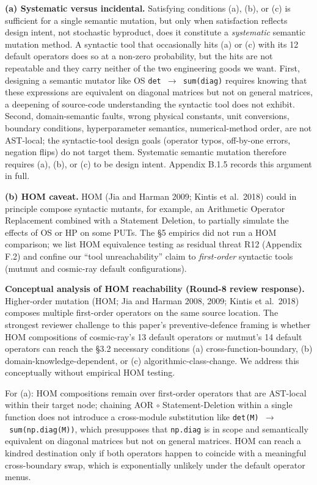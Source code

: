 \documentclass[review,12pt,authoryear]{elsarticle}
\begin{document}
\textbf{(a) Systematic versus incidental.} Satisfying conditions (a),
(b), or (c) is sufficient for a single semantic mutation, but only when
satisfaction reflects design intent, not stochastic byproduct, does it
constitute a \emph{systematic} semantic mutation method. A syntactic
tool that occasionally hits (a) or (c) with its 12 default operators
does so at a non-zero probability, but the hits are not repeatable and
they carry neither of the two engineering goods we want. First,
designing a semantic mutator like OS \texttt{det\ $\to$\ sum(diag)} requires
knowing that these expressions are equivalent on diagonal matrices but
not on general matrices, a deepening of source-code understanding the
syntactic tool does not exhibit. Second, domain-semantic faults, wrong
physical constants, unit conversions, boundary conditions,
hyperparameter semantics, numerical-method order, are not AST-local; the
syntactic-tool design goals (operator typos, off-by-one errors, negation
flips) do not target them. Systematic semantic mutation therefore
requires (a), (b), or (c) to be design intent. Appendix B.1.5 records
this argument in full.

\textbf{(b) HOM caveat.} HOM (Jia and Harman 2009; Kintis et al.~2018)
could in principle compose syntactic mutants, for example, an Arithmetic
Operator Replacement combined with a Statement Deletion, to partially
simulate the effects of OS or HP on some PUTs. The §5 empirics did not
run a HOM comparison; we list HOM equivalence testing as residual threat
R12 (Appendix F.2) and confine our ``tool unreachability'' claim to
\emph{first-order} syntactic tools (mutmut and cosmic-ray default
configurations).

\textbf{Conceptual analysis of HOM reachability (Round-8 review
response).} Higher-order mutation (HOM; Jia and Harman 2008, 2009;
Kintis et al.~2018) composes multiple first-order operators on the same
source location. The strongest reviewer challenge to this paper's
preventive-defence framing is whether HOM compositions of cosmic-ray's
13 default operators or mutmut's 14 default operators can reach the §3.2
necessary conditions (a) cross-function-boundary, (b)
domain-knowledge-dependent, or (c) algorithmic-class-change. We address
this conceptually without empirical HOM testing.

For (a): HOM compositions remain over first-order operators that are
AST-local within their target node; chaining AOR $\circ$ Statement-Deletion
within a single function does not introduce a cross-module substitution
like \texttt{det(M)\ $\to$\ sum(np.diag(M))}, which presupposes that
\texttt{np.diag} is in scope and semantically equivalent on diagonal
matrices but not on general matrices. HOM can reach a kindred
destination only if both operators happen to coincide with a meaningful
cross-boundary swap, which is exponentially unlikely under the default
operator menus.
\end{document}
